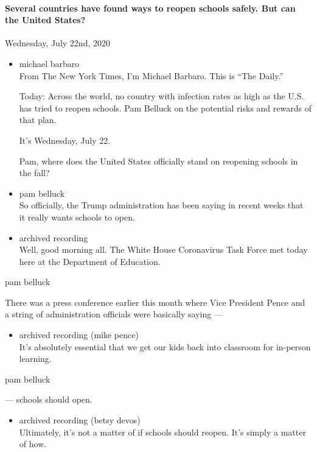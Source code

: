 \hypertarget{several-countries-have-found-ways-to-reopen-schools-safely-but-can-the-united-states-2}{%
\paragraph{Several countries have found ways to reopen schools safely.
But can the United
States?}\label{several-countries-have-found-ways-to-reopen-schools-safely-but-can-the-united-states-2}}

Wednesday, July 22nd, 2020

\begin{itemize}
\item
  michael barbaro\\
  From The New York Times, I'm Michael Barbaro. This is ``The Daily.''

  Today: Across the world, no country with infection rates as high as
  the U.S. has tried to reopen schools. Pam Belluck on the potential
  risks and rewards of that plan.

  It's Wednesday, July 22.

  Pam, where does the United States officially stand on reopening
  schools in the fall?
\item
  pam belluck\\
  So officially, the Trump administration has been saying in recent
  weeks that it really wants schools to open.
\item
  archived recording\\
  Well, good morning all. The White House Coronavirus Task Force met
  today here at the Department of Education.
\end{itemize}

pam belluck

There was a press conference earlier this month where Vice President
Pence and a string of administration officials were basically saying ---

\begin{itemize}
\tightlist
\item
  archived recording (mike pence)\\
  It's absolutely essential that we get our kids back into classroom for
  in-person learning.
\end{itemize}

pam belluck

--- schools should open.

\begin{itemize}
\tightlist
\item
  archived recording (betsy devos)\\
  Ultimately, it's not a matter of if schools should reopen. It's simply
  a matter of how.
\end{itemize}

